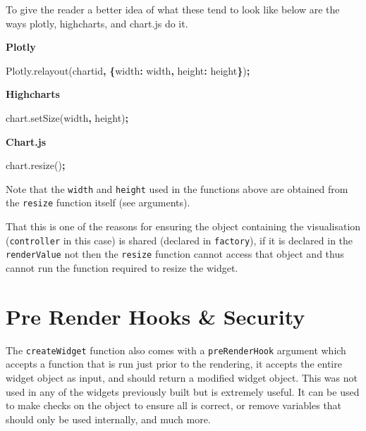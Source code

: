 \documentclass[
]{krantz}
\makeatletter
\newenvironment{Shaded}{\begin{snugshade}}{\end{snugshade}}
\newcommand{\AttributeTok}[1]{\textcolor[rgb]{0.61,0.61,0.61}{#1}}
\newcommand{\DataTypeTok}[1]{\textcolor[rgb]{0.27,0.27,0.27}{#1}}
\newcommand{\NormalTok}[1]{#1}
\newcommand{\OperatorTok}[1]{\textcolor[rgb]{0.43,0.43,0.43}{\textbf{#1}}}
\newcommand{\StringTok}[1]{\textcolor[rgb]{0.5,0.5,0.5}{#1}}
\newcommand{\VariableTok}[1]{\textcolor[rgb]{0,0,0}{#1}}
\newenvironment{kframe}{%
\medskip{}
\setlength{\fboxsep}{.8em}
 \def\at@end@of@kframe{}%
 \ifinner\ifhmode%
  \def\at@end@of@kframe{\end{minipage}}%
  \begin{minipage}{\columnwidth}%
 \fi\fi%
 \def\FrameCommand##1{\hskip\@totalleftmargin \hskip-\fboxsep
 \colorbox{shadecolor}{##1}\hskip-\fboxsep
     \hskip-\linewidth \hskip-\@totalleftmargin \hskip\columnwidth}%
 \MakeFramed {\advance\hsize-\width
   \@totalleftmargin\z@ \linewidth\hsize
   \@setminipage}}%
 {\par\unskip\endMakeFramed%
 \at@end@of@kframe}
\renewenvironment{Shaded}{\begin{kframe}}{\end{kframe}}
\makeatother
\begin{document}
To give the reader a better idea of what these tend to look like below are the ways plotly, highcharts, and chart.js do it.

\textbf{Plotly}

\begin{Shaded}
\begin{Highlighting}[]
\VariableTok{Plotly}\NormalTok{.}\AttributeTok{relayout}\NormalTok{(}\StringTok{\textquotesingle{}chartid\textquotesingle{}}\OperatorTok{,} \OperatorTok{\{}\DataTypeTok{width}\OperatorTok{:}\NormalTok{ width}\OperatorTok{,} \DataTypeTok{height}\OperatorTok{:}\NormalTok{ height}\OperatorTok{\}}\NormalTok{)}\OperatorTok{;}
\end{Highlighting}
\end{Shaded}

\textbf{Highcharts}

\begin{Shaded}
\begin{Highlighting}[]
\VariableTok{chart}\NormalTok{.}\AttributeTok{setSize}\NormalTok{(width}\OperatorTok{,}\NormalTok{ height)}\OperatorTok{;}
\end{Highlighting}
\end{Shaded}

\textbf{Chart.js}

\begin{Shaded}
\begin{Highlighting}[]
\VariableTok{chart}\NormalTok{.}\AttributeTok{resize}\NormalTok{()}\OperatorTok{;}
\end{Highlighting}
\end{Shaded}

Note that the \texttt{width} and \texttt{height} used in the functions above are obtained from the \texttt{resize} function itself (see arguments).

That this is one of the reasons for ensuring the object containing the visualisation (\texttt{controller} in this case) is shared (declared in \texttt{factory}), if it is declared in the \texttt{renderValue} not then the \texttt{resize} function cannot access that object and thus cannot run the function required to resize the widget.

\hypertarget{pre-render-hooks-security}{%
\section{Pre Render Hooks \& Security}\label{pre-render-hooks-security}}

The \texttt{createWidget} function also comes with a \texttt{preRenderHook} argument which accepts a function that is run just prior to the rendering, it accepts the entire widget object as input, and should return a modified widget object. This was not used in any of the widgets previously built but is extremely useful. It can be used to make checks on the object to ensure all is correct, or remove variables that should only be used internally, and much more.
\end{document}
